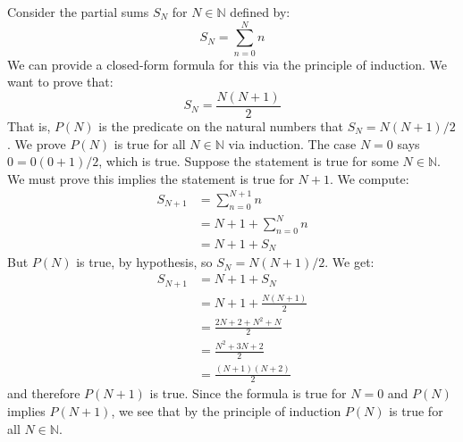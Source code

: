\documentclass{article}
\theoremstyle{plain}
\theoremstyle{normal}
\newenvironment{example}{%
    \pushQED{\qed}\renewcommand{\qedsymbol}{$\blacksquare$}\examplex%
}{%
    \popQED\endexamplex%
}
\begin{document}
    \begin{example}
        Consider the partial sums $S_{N}$ for $N\in\mathbb{N}$ defined by:
        \begin{equation}
            S_{N}=\sum_{n=0}^{N}n
        \end{equation}
        We can provide a closed-form formula for this via the principle of
        induction. We want to prove that:
        \begin{equation}
            S_{N}=\frac{N(N+1)}{2}
        \end{equation}
        That is, $P(N)$ is the predicate on the natural numbers that
        $S_{N}=N(N+1)/2$. We prove $P(N)$ is true for all $N\in\mathbb{N}$
        via induction. The case $N=0$ says
        $0=0(0+1)/2$, which is true. Suppose the statement is true for
        some $N\in\mathbb{N}$. We must prove this implies the statement is
        true for $N+1$. We compute:
        \begin{align}
            S_{N+1}
            &=\sum_{n=0}^{N+1}n\\
            &=N+1+\sum_{n=0}^{N}n\\
            &=N+1+S_{N}
        \end{align}
        But $P(N)$ is true, by hypothesis, so $S_{N}=N(N+1)/2$. We get:
        \begin{align}
            S_{N+1}
            &=N+1+S_{N}\\
            &=N+1+\frac{N(N+1)}{2}\\
            &=\frac{2N+2+N^{2}+N}{2}\\
            &=\frac{N^{2}+3N+2}{2}\\
            &=\frac{(N+1)(N+2)}{2}
        \end{align}
        and therefore $P(N+1)$ is true. Since the formula is true for
        $N=0$ and $P(N)$ implies $P(N+1)$, we see that by the principle of
        induction $P(N)$ is true for all $N\in\mathbb{N}$.    
    \end{example}
\end{document}
